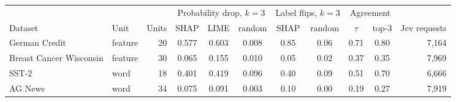 \begin{tabular}{llrcccccccr}
\toprule
 & & & \multicolumn{3}{c}{Probability drop, $k=3$} & \multicolumn{2}{c}{Label flips, $k=3$} & \multicolumn{2}{c}{Agreement} & \\
\cmidrule(lr){4-6}\cmidrule(lr){7-8}\cmidrule(lr){9-10}
Dataset & Unit & Units & SHAP & LIME & random & SHAP & random & $\tau$ & top-3 & Jev requests \\
\midrule
German Credit & feature & 20 & 0.577 & 0.603 & 0.008 & 0.85 & 0.06 & 0.71 & 0.80 & 7{,}164 \\
Breast Cancer Wisconsin & feature & 30 & 0.065 & 0.155 & 0.010 & 0.05 & 0.02 & 0.37 & 0.35 & 7{,}969 \\
SST-2 & word & 18 & 0.401 & 0.419 & 0.096 & 0.40 & 0.09 & 0.51 & 0.70 & 6{,}666 \\
AG News & word & 34 & 0.075 & 0.091 & 0.003 & 0.10 & 0.00 & 0.19 & 0.27 & 7{,}919 \\
\bottomrule
\end{tabular}
